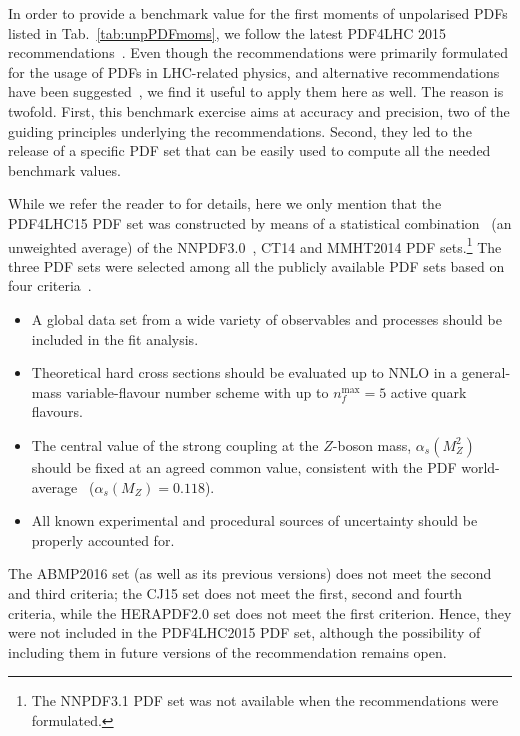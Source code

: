 In order to provide a benchmark value for the first moments of unpolarised PDFs
listed in Tab.~\ref{tab:unpPDFmoms}, we follow the latest PDF4LHC 2015 
recommendations~\cite{Butterworth:2015oua}.
%
Even though the recommendations were primarily formulated for the usage of PDFs
in LHC-related physics, and alternative recommendations have been 
suggested~\cite{Accardi:2016ndt}, we find it useful to apply them here as well.
%
The reason is twofold.
%
First, this benchmark exercise aims at accuracy and precision,  
two of the guiding principles underlying the recommendations.
%
Second, they led to the release of a specific PDF set
that can be easily used to compute all the needed benchmark values.

While we refer the reader to \cite{Butterworth:2015oua} for details,
here we only mention that the PDF4LHC15 PDF set was constructed by means of
a statistical
combination~\cite{Carrazza:2015hva,Gao:2013bia,Watt:2012tq,Carrazza:2015aoa} (an unweighted average) of the 
NNPDF3.0~\cite{Ball:2014uwa}, CT14 and MMHT2014 PDF sets.\footnote{The 
NNPDF3.1 PDF set was not available when the recommendations were formulated.}
%
The three PDF sets were selected among all the publicly available PDF sets
based on four criteria~\cite{Butterworth:2015oua}.
%
\begin{itemize}
%
\item A global data set from a wide variety of observables and processes
should be included in the fit analysis.
%
\item Theoretical hard cross sections should be evaluated up to NNLO in a
general-mass variable-flavour number scheme with up to $n_f^\text{max}=5$ 
active quark flavours.
%
\item The central value of the strong coupling at the $Z$-boson mass,
$\alpha_s(M_Z^2)$ should be fixed at an agreed common value, consistent 
with the PDF world-average~\cite{Olive:2016xmw} ($\alpha_s(M_Z)=0.118$).
%
\item All known experimental and procedural sources of uncertainty should be 
properly accounted for.
%
\end{itemize}
%
The ABMP2016 set (as well as its previous versions) does not meet the second 
and third criteria; the CJ15 set does not meet the first, second and fourth
criteria, while the HERAPDF2.0 set does not meet the first criterion.
%
Hence, they were not included in the PDF4LHC2015 PDF set, although the possibility
of including them in future versions of the recommendation remains open.


